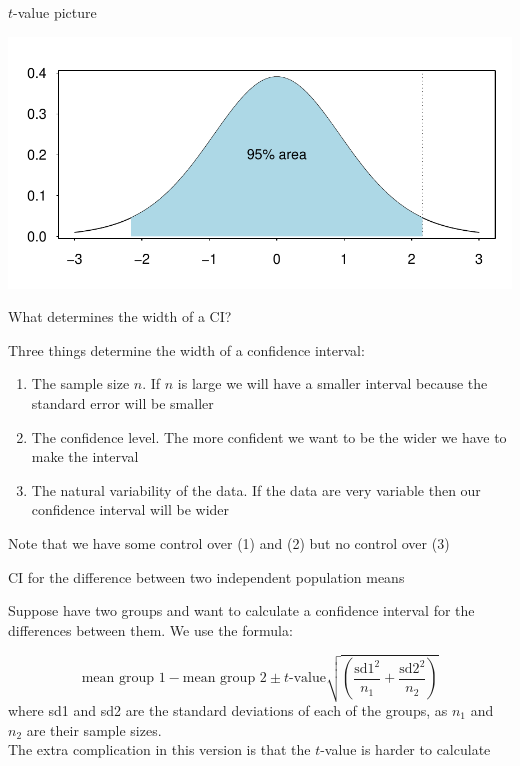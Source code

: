 \documentclass[12pt,xcolor=dvipsnames,handout,mathserif,aspectratio=169]{beamer}
\begin{document}
\begin{frame}{$t$-value picture}
\begin{center}
\includegraphics[width=\textwidth]{t_plot3.pdf}
\end{center}

\end{frame}

\begin{frame}{ What determines the width of a CI?}

Three things determine the width of a confidence interval:
\begin{enumerate}
\item The sample size $n$. If $n$ is large we will have a smaller interval because the standard error will be smaller
\item The confidence level. The more confident we want to be the wider we have to make the interval
\item The natural variability of the data. If the data are very variable then our confidence interval will be wider
\end{enumerate}
Note that we have some control over (1) and (2) but no control over (3)
\end{frame}

\begin{frame}{CI for the difference between two independent population means}

Suppose have two groups and want to calculate a confidence interval for the differences between them. We use the formula:

$$\mbox{mean group 1} - \mbox{mean group 2} \pm \mbox{$t$-value}\sqrt{ \left( \frac{\mbox{sd1}^2}{n_1}+\frac{\mbox{sd2}^2}{n_2} \right) }$$
where sd1 and sd2 are the standard deviations of each of the groups, as $n_1$ and $n_2$ are their sample sizes. \\
\vspace{0.5cm}
The extra complication in this version is that the $t$-value is harder to calculate
\end{frame}
\end{document}
